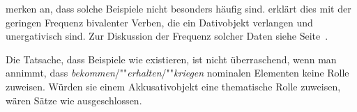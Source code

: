 \noindent
\citet{HW95a} merken an, dass solche Beispiele nicht besonders häufig sind.
\citet[]{Wegener90} erklärt dies mit der geringen Frequenz bivalenter
Verben, die ein Dativobjekt verlangen und unergativisch sind. Zur Diskussion der Frequenz
solcher Daten siehe Seite~\pageref{frequenz-von-korpusbelegen}.


Die Tatsache, dass Beispiele wie  
existieren, ist nicht überraschend, wenn man annimmt, dass
\emph{bekommen}/""\emph{erhalten}/""\emph{kriegen} nominalen Elementen keine Rolle
zuweisen. Würden sie einem Akkusativobjekt eine thematische Rolle zuweisen,
wären Sätze wie  ausgeschlossen.


